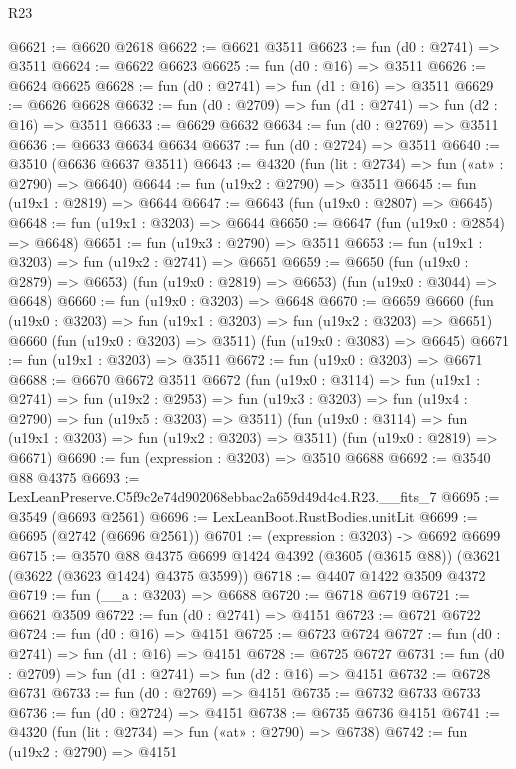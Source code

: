 \begin{lexlean}{R23}
\begin{coremodule}
@6621 := @6620 @2618
@6622 := @6621 @3511
@6623 := fun (d0 : @2741) => @3511
@6624 := @6622 @6623
@6625 := fun (d0 : @16) => @3511
@6626 := @6624 @6625
@6628 := fun (d0 : @2741) => fun (d1 : @16) => @3511
@6629 := @6626 @6628
@6632 := fun (d0 : @2709) => fun (d1 : @2741) => fun (d2 : @16) => @3511
@6633 := @6629 @6632
@6634 := fun (d0 : @2769) => @3511
@6636 := @6633 @6634 @6634
@6637 := fun (d0 : @2724) => @3511
@6640 := @3510 (@6636 @6637 @3511)
@6643 := @4320 (fun (lit : @2734) => fun («at» : @2790) => @6640)
@6644 := fun (u19x2 : @2790) => @3511
@6645 := fun (u19x1 : @2819) => @6644
@6647 := @6643 (fun (u19x0 : @2807) => @6645)
@6648 := fun (u19x1 : @3203) => @6644
@6650 := @6647 (fun (u19x0 : @2854) => @6648)
@6651 := fun (u19x3 : @2790) => @3511
@6653 := fun (u19x1 : @3203) => fun (u19x2 : @2741) => @6651
@6659 := @6650
    (fun (u19x0 : @2879) => @6653)
    (fun (u19x0 : @2819) => @6653)
    (fun (u19x0 : @3044) => @6648)
@6660 := fun (u19x0 : @3203) => @6648
@6670 := @6659
    @6660
    (fun (u19x0 : @3203) => fun (u19x1 : @3203) => fun (u19x2 : @3203) => @6651)
    @6660
    (fun (u19x0 : @3203) => @3511)
    (fun (u19x0 : @3083) => @6645)
@6671 := fun (u19x1 : @3203) => @3511
@6672 := fun (u19x0 : @3203) => @6671
@6688 := @6670
    @6672
    @3511
    @6672
    (fun (u19x0 : @3114) =>
    fun (u19x1 : @2741) =>
    fun (u19x2 : @2953) =>
    fun (u19x3 : @3203) => fun (u19x4 : @2790) => fun (u19x5 : @3203) => @3511)
    (fun (u19x0 : @3114) => fun (u19x1 : @3203) => fun (u19x2 : @3203) => @3511)
    (fun (u19x0 : @2819) => @6671)
@6690 := fun (expression : @3203) => @3510 @6688
@6692 := @3540 @88 @4375
@6693 := LexLeanPreserve.C5f9c2e74d902068ebbac2a659d49d4c4.R23.__fits_7
@6695 := @3549 (@6693 @2561)
@6696 := LexLeanBoot.RustBodies.unitLit
@6699 := @6695 (@2742 (@6696 @2561))
@6701 := (expression : @3203) -> @6692 @6699
@6715 := @3570
    @88
    @4375
    @6699
    @1424
    @4392
    (@3605 (@3615 @88))
    (@3621 (@3622 (@3623 @1424) @4375 @3599))
@6718 := @4407 @1422 @3509 @4372
@6719 := fun (__a : @3203) => @6688
@6720 := @6718 @6719
@6721 := @6621 @3509
@6722 := fun (d0 : @2741) => @4151
@6723 := @6721 @6722
@6724 := fun (d0 : @16) => @4151
@6725 := @6723 @6724
@6727 := fun (d0 : @2741) => fun (d1 : @16) => @4151
@6728 := @6725 @6727
@6731 := fun (d0 : @2709) => fun (d1 : @2741) => fun (d2 : @16) => @4151
@6732 := @6728 @6731
@6733 := fun (d0 : @2769) => @4151
@6735 := @6732 @6733 @6733
@6736 := fun (d0 : @2724) => @4151
@6738 := @6735 @6736 @4151
@6741 := @4320 (fun (lit : @2734) => fun («at» : @2790) => @6738)
@6742 := fun (u19x2 : @2790) => @4151

\end{coremodule}
\end{lexlean}
